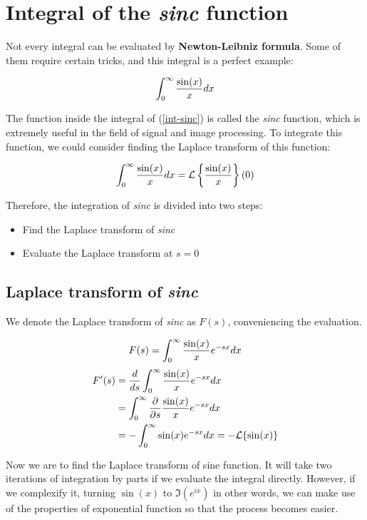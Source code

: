 \section{Integral of the \textit{sinc} function}

Not every integral can be evaluated by \textbf{Newton-Leibniz formula}. Some of
them require certain tricks, and this integral is a perfect example:

\begin{equation}
	\int_0^\infty{\sin(x)\over x}dx
	\label{int-sinc}
\end{equation}

The function inside the integral of (\ref{int-sinc}) is called the
\textit{sinc} function, which is extremely useful in the field of signal and
image processing. To integrate this function, we could consider finding the
Laplace transform of this function:

\begin{equation}
	\int_0^\infty{\sin(x)\over x}dx=\mathcal{L}
	\left\{\sin(x)\over x\right\}(0)
	\label{sinc-laplace}
\end{equation}

Therefore, the integration of \textit{sinc} is divided into two steps:

\begin{itemize}
	\item Find the Laplace transform of \textit{sinc}
	\item Evaluate the Laplace transform at $s=0$
\end{itemize}

\subsection{Laplace transform of \textit{sinc}}

We denote the Laplace transform of \textit{sinc} as $F(s)$, conveniencing the
evaluation.

$$F(s)=\int_0^\infty{\sin(x)\over x}e^{-sx}dx$$
$$
\begin{aligned}
	F'(s)&={d\over ds}\int_0^\infty{\sin(x)\over x}e^{-sx}dx \\
	&=\int_0^\infty{\partial\over\partial s}{\sin(x)\over x}e^{-sx}dx \\
	&=-\int_0^\infty\sin(x)e^{-sx}dx=-\mathcal{L}\{\sin(x)\}
\end{aligned}
$$

Now we are to find the Laplace transform of sine function. It will take two
iterations of integration by parts if we evaluate the integral directly.
However, if we complexify it, turning $\sin(x)$ to $\Im\left(e^{ix}\right)$ in
other words, we can make use of the properties of exponential function so that
the process becomes easier.

